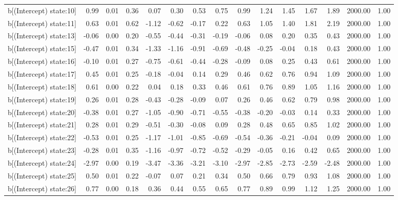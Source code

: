\begin{table}[ht]
\begin{tabular}{rrrrrrrrrrrrrrr}
  b[(Intercept) state:10] & 0.99 & 0.01 & 0.36 & 0.07 & 0.30 & 0.53 & 0.75 & 0.99 & 1.24 & 1.45 & 1.67 & 1.89 & 2000.00 & 1.00 \\ 
  b[(Intercept) state:11] & 0.63 & 0.01 & 0.62 & -1.12 & -0.62 & -0.17 & 0.22 & 0.63 & 1.05 & 1.40 & 1.81 & 2.19 & 2000.00 & 1.00 \\ 
  b[(Intercept) state:13] & -0.06 & 0.00 & 0.20 & -0.55 & -0.44 & -0.31 & -0.19 & -0.06 & 0.08 & 0.20 & 0.35 & 0.43 & 2000.00 & 1.00 \\ 
  b[(Intercept) state:15] & -0.47 & 0.01 & 0.34 & -1.33 & -1.16 & -0.91 & -0.69 & -0.48 & -0.25 & -0.04 & 0.18 & 0.43 & 2000.00 & 1.00 \\ 
  b[(Intercept) state:16] & -0.10 & 0.01 & 0.27 & -0.75 & -0.61 & -0.44 & -0.28 & -0.09 & 0.08 & 0.25 & 0.43 & 0.61 & 2000.00 & 1.00 \\ 
  b[(Intercept) state:17] & 0.45 & 0.01 & 0.25 & -0.18 & -0.04 & 0.14 & 0.29 & 0.46 & 0.62 & 0.76 & 0.94 & 1.09 & 2000.00 & 1.00 \\ 
  b[(Intercept) state:18] & 0.61 & 0.00 & 0.22 & 0.04 & 0.18 & 0.33 & 0.46 & 0.61 & 0.76 & 0.89 & 1.05 & 1.16 & 2000.00 & 1.00 \\ 
  b[(Intercept) state:19] & 0.26 & 0.01 & 0.28 & -0.43 & -0.28 & -0.09 & 0.07 & 0.26 & 0.46 & 0.62 & 0.79 & 0.98 & 2000.00 & 1.00 \\ 
  b[(Intercept) state:20] & -0.38 & 0.01 & 0.27 & -1.05 & -0.90 & -0.71 & -0.55 & -0.38 & -0.20 & -0.03 & 0.14 & 0.33 & 2000.00 & 1.00 \\ 
  b[(Intercept) state:21] & 0.28 & 0.01 & 0.29 & -0.51 & -0.30 & -0.08 & 0.09 & 0.28 & 0.48 & 0.65 & 0.85 & 1.02 & 2000.00 & 1.00 \\ 
  b[(Intercept) state:22] & -0.53 & 0.01 & 0.25 & -1.17 & -1.01 & -0.85 & -0.69 & -0.54 & -0.36 & -0.21 & -0.04 & 0.09 & 2000.00 & 1.00 \\ 
  b[(Intercept) state:23] & -0.28 & 0.01 & 0.35 & -1.16 & -0.97 & -0.72 & -0.52 & -0.29 & -0.05 & 0.16 & 0.42 & 0.65 & 2000.00 & 1.00 \\ 
  b[(Intercept) state:24] & -2.97 & 0.00 & 0.19 & -3.47 & -3.36 & -3.21 & -3.10 & -2.97 & -2.85 & -2.73 & -2.59 & -2.48 & 2000.00 & 1.00 \\ 
  b[(Intercept) state:25] & 0.50 & 0.01 & 0.22 & -0.07 & 0.07 & 0.21 & 0.34 & 0.50 & 0.66 & 0.79 & 0.93 & 1.08 & 2000.00 & 1.00 \\ 
  b[(Intercept) state:26] & 0.77 & 0.00 & 0.18 & 0.36 & 0.44 & 0.55 & 0.65 & 0.77 & 0.89 & 0.99 & 1.12 & 1.25 & 2000.00 & 1.00 \\ 

\end{tabular}
\end{table}
